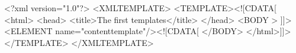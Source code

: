<?xml version="1.0"?> <XMLTEMPLATE>
    <TEMPLATE><![CDATA[
        <html>
            <head>
                <title>The first templates</title>
            </head>
            <BODY >
                ]]><ELEMENT name="contenttemplate"/><![CDATA[
            </BODY>
        </html>]]>
    </TEMPLATE>
</XMLTEMPLATE>
